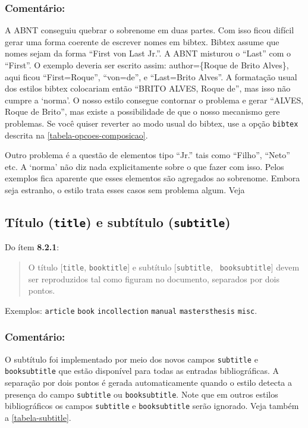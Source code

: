 \documentclass[a4paper]{ltxdoc}
\begin{document}
\subsubsection{Comentário:}
A ABNT conseguiu quebrar o sobrenome em duas partes. Com isso ficou difícil
gerar uma forma coerente de escrever nomes em \textsf{bibtex}.
\textsf{Bibtex} assume que nomes sejam da forma ``First von Last Jr.''. A ABNT
misturou o ``Last'' com o ``First''. O exemplo  deveria
ser escrito assim: author=\{Roque de Brito Alves\}, aqui ficou ``First=Roque'',
``von=de'',  e ``Last=Brito Alves''. A formatação usual dos estilos
\textsf{bibtex} colocariam então ``BRITO ALVES, Roque de'',  mas isso não cumpre
a `norma'. O nosso estilo consegue contornar o problema e gerar ``ALVES, Roque de
Brito'', mas existe a possibilidade de que o nosso mecanismo gere problemas.
Se você quiser reverter ao modo usual do \textsf{bibtex}, use a opção
{\tt bibtex} descrita na \autoref{tabela-opcoes-composicao}. 

Outro problema é a questão de elementos tipo ``Jr.'' tais como ``Filho'',
``Neto'' etc. A `norma' não diz nada explicitamente sobre o que fazer com isso.
Pelos exemplos fica aparente que esses elementos são agregados ao sobrenome.
Embora seja estranho, o estilo trata esses casos sem problema algum.
Veja 

\subsection{Título ({\tt title}) e subtítulo ({\tt subtitle})}

Do ítem {\bf 8.2.1}\cite{NBR6023:2000}:
\begin{quote}
O título [{\tt title}, {\tt booktitle}] e subtítulo [{\tt subtitle}, {\tt
booksubtitle}] devem ser reproduzidos tal como figuram no documento, separados
por dois pontos.
\end{quote}

Exemplos:
{\tt article}\cite{7.4.2.3-2}
{\tt book}\cite{7.1.3-5,7.1.3-10,7.10-3,8.1.1.1-3,8.2.1,8.5.3}
{\tt incollection}\cite{7.2.2-1}
{\tt manual}\cite{NBR6023:2000,7.1.3-7,7.1.3-8,7.1.3-9,7.10-4,8.1.2.1-1}
{\tt mastersthesis}\cite{8.11.4-2}
{\tt misc}\cite{7.13.2-1}.

\subsubsection{Comentário:}
O subtítulo foi implementado por meio dos novos campos {\tt subtitle}
e {\tt booksubtitle} que estão disponível para todas as entradas bibliográficas.
A separação por dois pontos é gerada automaticamente quando o estilo detecta a
presença do campo {\tt subtitle} ou {\tt booksubtitle}. Note que em outros
estilos bibliográficos os campos {\tt subtitle} e {\tt booksubtitle} serão
ignorado. Veja também a \autoref{tabela-subtitle}.
\end{document}
